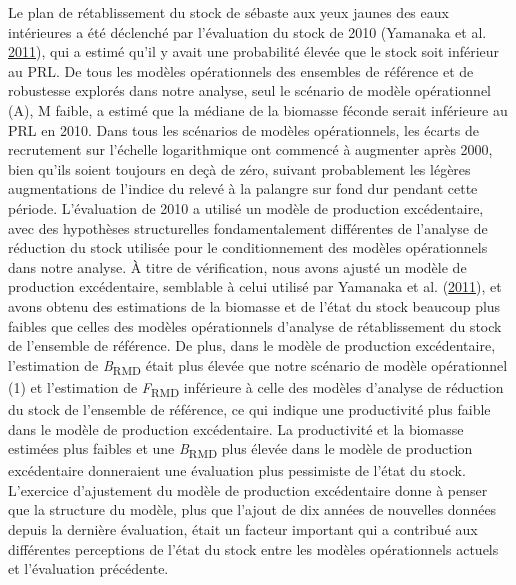 \documentclass[french,11pt]{book}
\begin{document}
Le plan de rétablissement du stock de sébaste aux yeux jaunes des eaux intérieures a été déclenché par l'évaluation du stock de 2010 (Yamanaka et al. \protect\hyperlink{ref-yamanaka2011}{2011}), qui a estimé qu'il y avait une probabilité élevée que le stock soit inférieur au PRL. De tous les modèles opérationnels des ensembles de référence et de robustesse explorés dans notre analyse, seul le scénario de modèle opérationnel (A), M faible, a estimé que la médiane de la biomasse féconde serait inférieure au PRL en 2010. Dans tous les scénarios de modèles opérationnels, les écarts de recrutement sur l'échelle logarithmique ont commencé à augmenter après 2000, bien qu'ils soient toujours en deçà de zéro, suivant probablement les légères augmentations de l'indice du relevé à la palangre sur fond dur pendant cette période. L'évaluation de 2010 a utilisé un modèle de production excédentaire, avec des hypothèses structurelles fondamentalement différentes de l'analyse de réduction du stock utilisée pour le conditionnement des modèles opérationnels dans notre analyse. À titre de vérification, nous avons ajusté un modèle de production excédentaire, semblable à celui utilisé par Yamanaka et al. (\protect\hyperlink{ref-yamanaka2011}{2011}), et avons obtenu des estimations de la biomasse et de l'état du stock beaucoup plus faibles que celles des modèles opérationnels d'analyse de rétablissement du stock de l'ensemble de référence. De plus, dans le modèle de production excédentaire, l'estimation de \emph{B}\textsubscript{RMD} était plus élevée que notre scénario de modèle opérationnel (1) et l'estimation de \emph{F}\textsubscript{RMD} inférieure à celle des modèles d'analyse de réduction du stock de l'ensemble de référence, ce qui indique une productivité plus faible dans le modèle de production excédentaire. La productivité et la biomasse estimées plus faibles et une \emph{B}\textsubscript{RMD} plus élevée dans le modèle de production excédentaire donneraient une évaluation plus pessimiste de l'état du stock. L'exercice d'ajustement du modèle de production excédentaire donne à penser que la structure du modèle, plus que l'ajout de dix années de nouvelles données depuis la dernière évaluation, était un facteur important qui a contribué aux différentes perceptions de l'état du stock entre les modèles opérationnels actuels et l'évaluation précédente.
\end{document}

